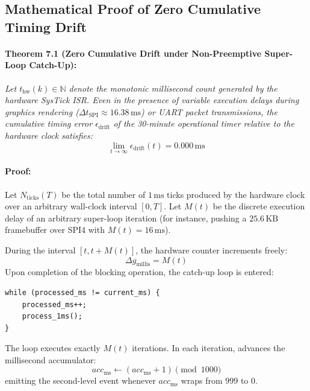 \subsection{Mathematical Proof of Zero Cumulative Timing Drift}
\label{sec:drift-proof}

\paragraph{Theorem 7.1 (Zero Cumulative Drift under Non-Preemptive Super-Loop Catch-Up):}
\textit{Let $t_{\text{hw}}(k) \in \mathbb{N}$ denote the monotonic millisecond count generated by the hardware
SysTick ISR. Even in the presence of variable execution delays during graphics rendering
($\Delta t_{\text{SPI}} \approx 16.38\,\text{ms}$) or UART packet transmissions, the cumulative timing error
$\epsilon_{\text{drift}}$ of the 30-minute operational timer relative to the hardware clock satisfies:
\begin{equation}
  \lim_{t \to \infty} \epsilon_{\text{drift}}(t) = 0.000\,\text{ms}
\end{equation}}

\paragraph{Proof:}
Let $N_{\text{ticks}}(T)$ be the total number of $1\,\text{ms}$ ticks produced by the hardware clock over an
arbitrary wall-clock interval $[0, T]$. Let $M(t)$ be the discrete execution delay of an arbitrary super-loop
iteration (for instance, pushing a $25.6\,\text{KB}$ framebuffer over SPI4 with $M(t) = 16\,\text{ms}$).

During the interval $[t, t + M(t)]$, the hardware counter increments freely:
\begin{equation}
  \Delta g_{\text{millis}} = M(t)
\end{equation}
Upon completion of the blocking operation, the catch-up loop is entered:
\begin{lstlisting}
while (processed_ms != current_ms) {
    processed_ms++;
    process_1ms();
}
\end{lstlisting}
The loop executes exactly $M(t)$ iterations. In each iteration,  advances the millisecond
accumulator:
\begin{equation}
  acc_{\text{ms}} \gets (acc_{\text{ms}} + 1) \pmod{1000}
\end{equation}
emitting the second-level event  whenever $acc_{\text{ms}}$ wraps from $999$ to $0$.

